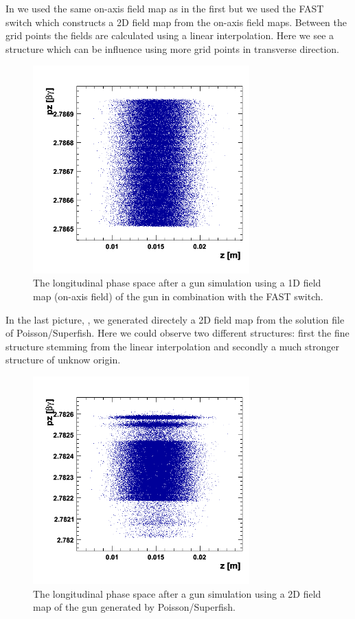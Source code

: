 In  we used the same on-axis field map as in the first but we used the FAST switch which constructs a 2D field map from the on-axis field maps. Between the grid points the fields are calculated using a linear interpolation. Here we see a structure which can be influence using more grid points in transverse direction.
\begin{figure}
  \begin{center}
  \includegraphics[origin=bl,height=80mm,angle=0]{./figures/Fieldmaps/1DDynamic_fast_step82.png}
  \caption{\label{figure_1ddynamic_fast_step82}
    The longitudinal phase space after a gun simulation using a 1D field map (on-axis field) of the gun in combination with the FAST switch.
  }
  \end{center}
%
\end{figure}
In the last picture, , we generated directely a 2D field map from the solution file of Poisson/Superfish. Here we could observe two different structures: first the fine structure stemming from the linear interpolation and secondly a much stronger structure of unknow origin.
\begin{figure}
  \begin{center}
  \includegraphics[origin=bl,height=80mm,angle=0]{./figures/Fieldmaps/2DDynamic_step82.png}
  \caption{\label{figure_2ddynamic_step82}
    The longitudinal phase space after a gun simulation using a 2D field map of the gun generated by Poisson/Superfish.
  }
  \end{center}
%
\end{figure}


